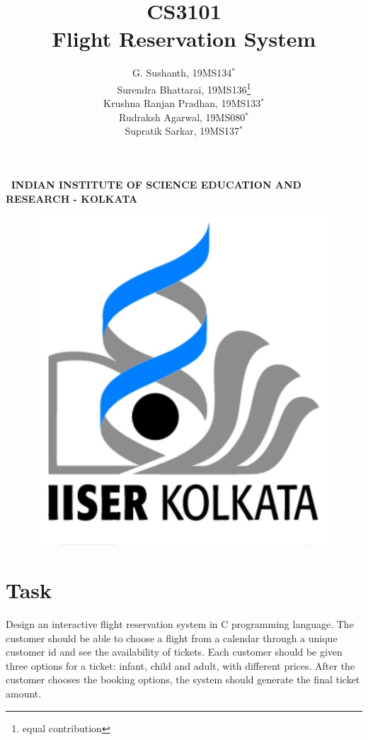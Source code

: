 \documentclass[12pt]{article}
\begin{document}
\title{\textbf{CS3101\\Flight Reservation System}}
\author{G. Sushanth, 19MS134$^*$\\Surendra Bhattarai, 19MS136\footnote{equal contribution}\\Krushna Ranjan Pradhan, 19MS133$^*$\\Rudraksh Agarwal, 19MS080$^*$\\Supratik Sarkar, 19MS137$^*$}
\date{}
\maketitle
\thispagestyle{empty}

\vspace{3cm}
\noindent \textbf{\textsc{\,   INDIAN INSTITUTE OF SCIENCE EDUCATION AND RESEARCH - KOLKATA}}
	\vspace{1.8cm}
  
\begin{figure}[!h]
\centering
\includegraphics[scale=0.45]{ii}
\end{figure}

\pagebreak
{}
\pagebreak
{}

\section{Task}
Design an interactive flight reservation system in C programming language. The
customer should be able to choose a flight from a calendar through a unique customer id
and see the availability of tickets. Each customer should be given three options for a
ticket: infant, child and adult, with different prices. After the customer chooses the
booking options, the system should generate the final ticket amount.\\
\end{document}
